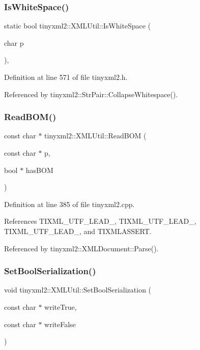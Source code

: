 \subsubsection{IsWhiteSpace()}
{\footnotesize\ttfamily static bool tinyxml2\+::\+X\+M\+L\+Util\+::\+Is\+White\+Space (\begin{DoxyParamCaption}\item[{char}]{p }\end{DoxyParamCaption})\hspace{0.3cm}{\ttfamily [inline]}, {\ttfamily [static]}}



Definition at line 571 of file tinyxml2.\+h.



Referenced by tinyxml2\+::\+Str\+Pair\+::\+Collapse\+Whitespace().

\mbox{\label{classtinyxml2_1_1_x_m_l_util_ae9bcb2bc3cd6475fdc644c8c17790555}} 
\subsubsection{ReadBOM()}
{\footnotesize\ttfamily const char $\ast$ tinyxml2\+::\+X\+M\+L\+Util\+::\+Read\+B\+OM (\begin{DoxyParamCaption}\item[{const char $\ast$}]{p,  }\item[{bool $\ast$}]{has\+B\+OM }\end{DoxyParamCaption})\hspace{0.3cm}{\ttfamily [static]}}



Definition at line 385 of file tinyxml2.\+cpp.



References T\+I\+X\+M\+L\+\_\+\+U\+T\+F\+\_\+\+L\+E\+A\+D\+\_, T\+I\+X\+M\+L\+\_\+\+U\+T\+F\+\_\+\+L\+E\+A\+D\+\_, T\+I\+X\+M\+L\+\_\+\+U\+T\+F\+\_\+\+L\+E\+A\+D\+\_, and T\+I\+X\+M\+L\+A\+S\+S\+E\+RT.



Referenced by tinyxml2\+::\+X\+M\+L\+Document\+::\+Parse().

\mbox{\label{classtinyxml2_1_1_x_m_l_util_af98a6a80dbeec4679366c1aba4c5b747}} 
\subsubsection{SetBoolSerialization()}
{\footnotesize\ttfamily void tinyxml2\+::\+X\+M\+L\+Util\+::\+Set\+Bool\+Serialization (\begin{DoxyParamCaption}\item[{const char $\ast$}]{write\+True,  }\item[{const char $\ast$}]{write\+False }\end{DoxyParamCaption})\hspace{0.3cm}{\ttfamily [static]}}



